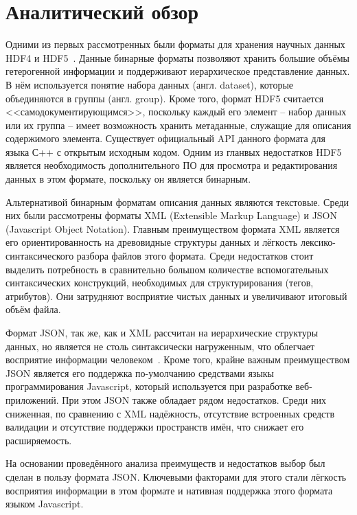 \chapter{Аналитический обзор}\label{chap2_review}
Одними из первых рассмотренных были форматы для хранения научных данных HDF4 и HDF5~\cite{HDFOffCite}. Данные бинарные форматы позволяют хранить большие объёмы гетерогенной информации и поддерживают иерархическое представление данных. В нём используется понятие набора данных (англ. dataset), которые объединяются в группы (англ. group). Кроме того, формат HDF5 считается <<самодокументирующимся>>, поскольку каждый его элемент -- набор данных или их группа -- имеет возможность хранить метаданные, служащие для описания содержимого элемента. Существует официальный API данного формата для языка С++ с открытым исходным кодом. Одним из гланвых недостатков HDF5 является необходимость дополнительного ПО для просмотра и редактирования данных в этом формате, поскольку он является бинарным.

Альтернативой бинарным форматам описания данных являются текстовые. Среди них были рассмотрены форматы XML (Extensible Markup Language) и JSON (Javascript Object Notation). Главным преимуществом формата XML является его ориентированность на древовидные структуры данных и лёгкость лексико-синтаксического разбора файлов этого формата. Среди недостатков стоит выделить потребность в сравнительно большом количестве вспомогательных синтаксических конструкций, необходимых для структурирования (тегов, атрибутов). Они затрудняют восприятие чистых данных и увеличивают итоговый объём файла.

Формат JSON, так же, как и XML рассчитан на иерархические структуры данных, но является не столь синтаксически нагруженным, что облегчает восприятие информации человеком~\cite{JSONvsXML}. Кроме того, крайне важным преимуществом JSON является его поддержка по-умолчанию средствами языкы программирования Javascript, который используется при разработке веб-приложений. При этом JSON также обладает рядом недостатков. Среди них сниженная, по сравнению с XML надёжность, отсутствие встроенных средств валидации и отсутствие поддержки пространств имён, что снижает его расширяемость.

На основании проведённого анализа преимуществ и недостатков выбор был сделан в пользу формата JSON. Ключевыми факторами для этого стали лёгкость восприятия информации в этом формате и нативная поддержка этого формата языком Javascript.


